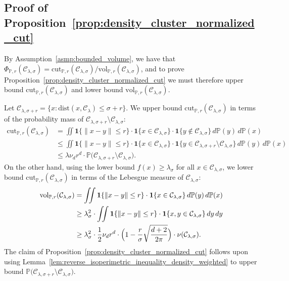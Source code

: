\documentclass{article}
\newcommand{\vol}{\mathrm{vol}}
\newcommand{\cut}{\mathrm{cut}}
\newcommand{\1}{\mathbf{1}}
\newcommand{\mc}[1]{\mathcal{#1}}
\newcommand{\Pbb}{\mathbb{P}}
\theoremstyle{definition}
\theoremstyle{remark}
\begin{document}
\subsection{Proof of Proposition~\ref{prop:density_cluster_normalized_cut}}
\label{subsec:density_cluster_ncut}
By Assumption~\ref{asmp:bounded_volume}, we have that $\Phi_{\Pbb,r}(\mc{C}_{\lambda,\sigma}) = \cut_{\Pbb,r}(\mc{C}_{\lambda,\sigma})/\vol_{\Pbb,r}(\mc{C}_{\lambda,\sigma})$, and to prove Proposition~\ref{prop:density_cluster_normalized_cut} we must therefore upper bound $\cut_{\Pbb,r}(\mc{C}_{\lambda,\sigma})$ and lower bound $\vol_{\Pbb,r}(\mc{C}_{\lambda,\sigma})$. 

Let $\mc{C}_{\lambda,\sigma + r} = \{x: \mathrm{dist}(x,\mc{C}_{\lambda}) \leq \sigma + r\}$. We upper bound $\cut_{\Pbb,r}(\mc{C}_{\lambda,\sigma})$ in terms of the probability mass of $\mc{C}_{\lambda,\sigma + r} \setminus \mc{C}_{\lambda,\sigma}$:
\begin{align*}
\cut_{\Pbb,r}(\mc{C}_{\lambda,\sigma}) & = \iint \1\{\|x - y\| \leq r \} \cdot \1\{x \in \mc{C}_{\lambda,\sigma}\} \cdot \1\{y \not\in \mc{C}_{\lambda,\sigma} \} \,d\Pbb(y) \,d\Pbb(x) \\
& \leq  \iint \1\{\|x - y\| \leq r \} \cdot \1\{x \in \mc{C}_{\lambda,\sigma}\} \cdot \1\{y \in \mc{C}_{\lambda,\sigma + r} \setminus \mc{C}_{\lambda,\sigma}  \} \,d\Pbb(y) \,d\Pbb(x) \\
& \leq \lambda \nu_d r^d \cdot \Pbb\bigl(\mc{C}_{\lambda,\sigma + r} \setminus \mc{C}_{\lambda,\sigma}\bigr).
\end{align*}
On the other hand, using the lower bound $f(x) \geq \lambda_{\sigma} $ for all $x \in \mc{C}_{\lambda,\sigma}$, we lower bound $\cut_{\Pbb,r}(\mc{C}_{\lambda,\sigma})$ in terms of the Lebesgue measure of $\mc{C}_{\lambda,\sigma}$:
\begin{align*}
\vol_{\Pbb,r}(\mc{C}_{\lambda,\sigma}) & = \iint \1\{\|x - y\| \leq r \} \cdot \1\{x \in \mc{C}_{\lambda,\sigma}\} \,d\Pbb(y) \,d\Pbb(x) \\
& \geq \lambda_{\sigma}^2 \cdot \iint \1\{\|x - y\| \leq r \} \cdot \1\{x,y \in \mc{C}_{\lambda,\sigma}\} \,dy \,dy \\
& \geq \lambda_{\sigma}^2 \cdot \frac{1}{2} \nu_d r^d \cdot \Bigl(1 - \frac{r}{\sigma} \sqrt{\frac{d + 2}{2\pi}}\Bigr) \cdot \nu(\mc{C}_{\lambda,\sigma}).
\end{align*}
The claim of Proposition~\ref{prop:density_cluster_normalized_cut} follows upon using Lemma~\ref{lem:reverse_isoperimetric_inequality_density_weighted} to upper bound $\Pbb\bigl(\mc{C}_{\lambda,\sigma + r} \setminus \mc{C}_{\lambda,\sigma}\bigr)$.
\end{document}
